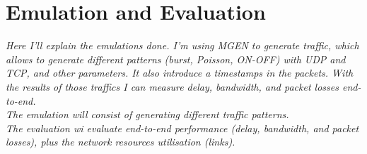 \chapter{Emulation and Evaluation}
\label{ch:emulation}

\textit{ {\color{red}Here I'll explain the emulations done. I'm using MGEN to generate traffic, which allows to generate different patterns (burst, Poisson, ON-OFF) with UDP and TCP, and other parameters. It also introduce a timestamps in the packets. With the results of those traffics I can measure delay, bandwidth, and packet losses end-to-end.\\
The emulation will consist of generating different traffic patterns.\\ 
The evaluation wi evaluate end-to-end performance (delay, bandwidth, and packet losses), plus the network resources utilisation (links).}}

%




